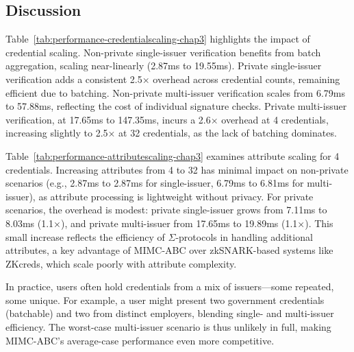 \subsection{Discussion}

Table~\ref{tab:performance-credentialscaling-chap3} highlights the impact of credential scaling. Non-private single-issuer verification benefits from batch aggregation, scaling near-linearly (2.87ms to 19.55ms). Private single-issuer verification adds a consistent 2.5× overhead across credential counts, remaining efficient due to batching. Non-private multi-issuer verification scales from 6.79ms to 57.88ms, reflecting the cost of individual signature checks. Private multi-issuer verification, at 17.65ms to 147.35ms, incurs a 2.6× overhead at 4 credentials, increasing slightly to 2.5× at 32 credentials, as the lack of batching dominates.

Table~\ref{tab:performance-attributescaling-chap3} examines attribute scaling for 4 credentials. Increasing attributes from 4 to 32 has minimal impact on non-private scenarios (e.g., 2.87ms to 2.87ms for single-issuer, 6.79ms to 6.81ms for multi-issuer), as attribute processing is lightweight without privacy. For private scenarios, the overhead is modest: private single-issuer grows from 7.11ms to 8.03ms (1.1×), and private multi-issuer from 17.65ms to 19.89ms (1.1×). This small increase reflects the efficiency of $\Sigma$-protocols in handling additional attributes, a key advantage of MIMC-ABC over zkSNARK-based systems like ZKcreds, which scale poorly with attribute complexity.

In practice, users often hold credentials from a mix of issuers—some repeated, some unique. For example, a user might present two government credentials (batchable) and two from distinct employers, blending single- and multi-issuer efficiency. The worst-case multi-issuer scenario is thus unlikely in full, making MIMC-ABC’s average-case performance even more competitive. 
